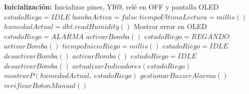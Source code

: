 \begin{algorithm}[ht]
\caption{Algoritmo de Sistema de Riego Automático}
\label{alg:Algoritmo_Riego}
\begin{algorithmic}[1]
\Statex \textbf{Inicialización:}
\State Inicializar pines, YI69, relé en OFF y pantalla OLED
\State $estadoRiego = IDLE$
\State $bombaActiva = false$
        \State $tiempoUltimaLectura = millis()$
        \State $humedadActual = dht.readHumidity()$
            \State Mostrar error en OLED
        \Else
                    \State $estadoRiego = ALARMA$
                    \State $activarBomba()$
                    \State $estadoRiego = REGANDO$
                    \State $activarBomba()$
                    \State $tiempoInicioRiego = millis()$
                \EndIf
                        \State $estadoRiego = IDLE$
                        \State $desactivarBomba()$
                    \EndIf
                \EndIf
                \State $activarBomba()$
                    \State $estadoRiego = IDLE$
                    \State $desactivarBomba()$
                \EndIf
            \EndIf
            \State $actualizarIndicadores(estadoRiego)$
            \State $mostrarP(humedadActual,\ estadoRiego)$
        \EndIf
    \EndIf
    \State $gestionarBuzzerAlarma()$
    \State $verificarBotonManual()$
\EndWhile
\end{algorithmic}
\end{algorithm}